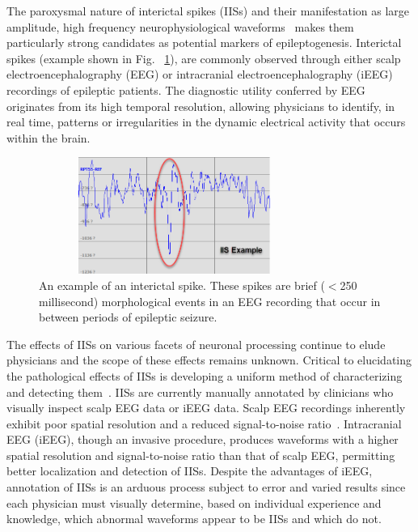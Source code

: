 \documentclass[letterpaper, 10pt, conference]{ieeeconf}      %
\begin{document}
The paroxysmal nature of interictal spikes (IISs) and their manifestation as large amplitude, high frequency neurophysiological waveforms~\cite{c2} makes them particularly strong candidates as potential markers of epileptogenesis. Interictal spikes (example shown in Fig. ~\ref{fig1}), are commonly observed through either scalp electroencephalography (EEG) or intracranial electroencephalography (iEEG) recordings of epileptic patients. The diagnostic utility conferred by EEG originates from its high temporal resolution, allowing physicians to identify, in real time, patterns or irregularities in the dynamic electrical activity that occurs within the brain. 

\begin{figure}[t!]
    \centering
    \includegraphics[height=1.5in, width=3.5in]{IISExample.png}
    \caption{An example of an interictal spike. These spikes are brief ($<$250 millisecond) morphological events in an EEG recording that occur in between periods of epileptic seizure.}
    \label{fig1}
\end{figure}

The effects of IISs on various facets of neuronal processing continue to elude physicians and the scope of these effects remains unknown. Critical to elucidating the pathological effects of IISs is developing a uniform method of characterizing and detecting them~\cite{c5}. IISs are currently manually annotated by clinicians who visually inspect scalp EEG data or iEEG data. Scalp EEG recordings inherently exhibit poor spatial resolution and a reduced signal-to-noise ratio~\cite{c12}. Intracranial EEG (iEEG), though an invasive procedure, produces waveforms with a higher spatial resolution and signal-to-noise ratio than that of scalp EEG, permitting better localization and detection of IISs. Despite the advantages of iEEG, annotation of IISs is an arduous process subject to error and varied results since each physician must visually determine, based on individual experience and knowledge, which abnormal waveforms appear to be IISs and which do not. 
\end{document}
